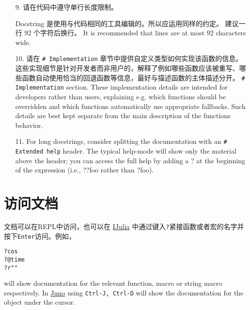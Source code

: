 \begin{itemize}
\item[9.  ] 请在代码中遵守单行长度限制。

Docstring 是使用与代码相同的工具编辑的。所以应运用同样的约定。 建议一行 92 个字符后换行。 It is recommended that lines are at most 92 characters wide.


\item[10. ] 请在 \texttt{\# Implementation} 章节中提供自定义类型如何实现该函数的信息。这些实现细节是针对开发者而非用户的，解释了例如哪些函数应该被重写、哪些函数自动使用恰当的回退函数等信息，最好与描述函数的主体描述分开。 \texttt{\# Implementation} section. These implementation details are intended for developers rather than users, explaining e.g. which functions should be overridden and which functions automatically use appropriate fallbacks. Such details are best kept separate from the main description of the function{\textquotesingle}s behavior.


\item[11. ] For long docstrings, consider splitting the documentation with an \texttt{\# Extended help} header. The typical help-mode will show only the material above the header; you can access the full help by adding a {\textquotesingle}?{\textquotesingle} at the beginning of the expression (i.e., {\textquotedbl}??foo{\textquotedbl} rather than {\textquotedbl}?foo{\textquotedbl}).

\end{itemize}


\hypertarget{10486321714157126961}{}


\section{访问文档}



文档可以在REPL中访问，也可以在 \href{https://github.com/JuliaLang/IJulia.jl}{IJulia} 中通过键入\texttt{?}紧接函数或者宏的名字并按下\texttt{Enter}访问。例如，




\begin{verbatim}
?cos
?@time
?r""
\end{verbatim}



will show documentation for the relevant function, macro or string macro respectively. In \href{http://junolab.org}{Juno} using \texttt{Ctrl-J, Ctrl-D} will show the documentation for the object under the cursor.




